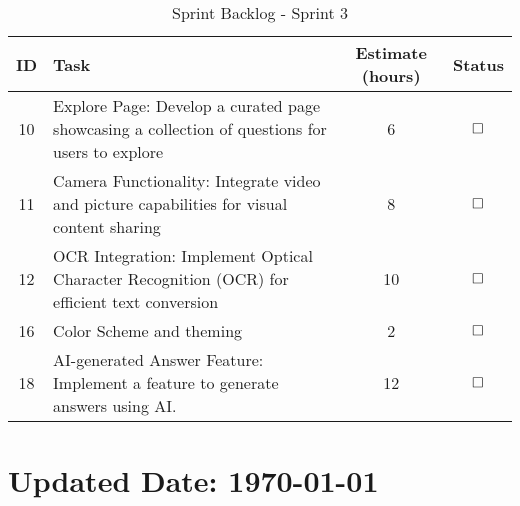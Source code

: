 \begin{table}[H]
    \centering
    \caption*{Sprint Backlog - Sprint 3}
    \begin{tabular}{|c|p{5cm}|c|c|}
        \hline
        \textbf{ID} & \textbf{Task} & \textbf{Estimate (hours)} & \textbf{Status}\\
        \hline
        10 & Explore Page: Develop a curated page showcasing a collection of questions for users to explore & 6 & $\text{\rlap{}}\square$\\
        \hline
        11 & Camera Functionality: Integrate video and picture capabilities for visual content sharing & 8 & $\text{\rlap{}}\square$\\
        \hline
        12 & OCR Integration: Implement Optical Character Recognition (OCR) for efficient text conversion & 10 & $\text{\rlap{}}\square$\\
        \hline
        16 & Color Scheme and theming & 2 & $\text{\rlap{}}\square$\\
        \hline
        18 & AI-generated Answer Feature: Implement a feature to generate answers using AI. & 12 & $\text{\rlap{}}\square$\\
        \hline
    \end{tabular}
\end{table}


\section*{Updated Date: \today}
